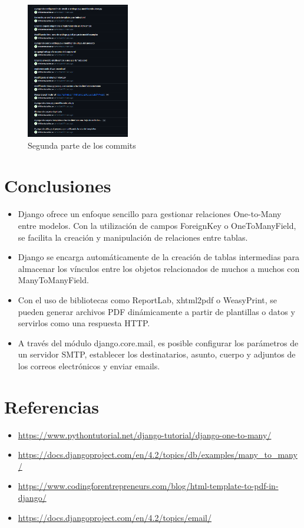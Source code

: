 \documentclass{article}
\begin{document}
        \begin{figure}[H]
        \centering
        \includegraphics[width=0.4\textwidth]{img/commits02.png}
        \caption*{Segunda parte de los commits}
        \end{figure}
        \vspace{0.5cm}
        \section{Conclusiones}
	\begin{itemize}			
		\item Django ofrece un enfoque sencillo para gestionar relaciones One-to-Many entre modelos. Con la utilización de campos ForeignKey o OneToManyField, se facilita la creación y manipulación de relaciones entre tablas.
            \item Django se encarga automáticamente de la creación de tablas intermedias para almacenar los vínculos entre los objetos relacionados de muchos a muchos con ManyToManyField.
            \item Con el uso de bibliotecas como ReportLab, xhtml2pdf o WeasyPrint, se pueden generar archivos PDF dinámicamente a partir de plantillas o datos y servirlos como una respuesta HTTP. 
            \item A través del módulo django.core.mail, es posible configurar los parámetros de un servidor SMTP, establecer los destinatarios, asunto, cuerpo y adjuntos de los correos electrónicos y enviar emails.
	\end{itemize}

        \section{Referencias}
	\begin{itemize}		
            \item \url{https://www.pythontutorial.net/django-tutorial/django-one-to-many/}
		\item \url{https://docs.djangoproject.com/en/4.2/topics/db/examples/many_to_many/}
            \item \url{https://www.codingforentrepreneurs.com/blog/html-template-to-pdf-in-django/}
            \item \url{https://docs.djangoproject.com/en/4.2/topics/email/}
	\end{itemize}        
 
\end{document}

